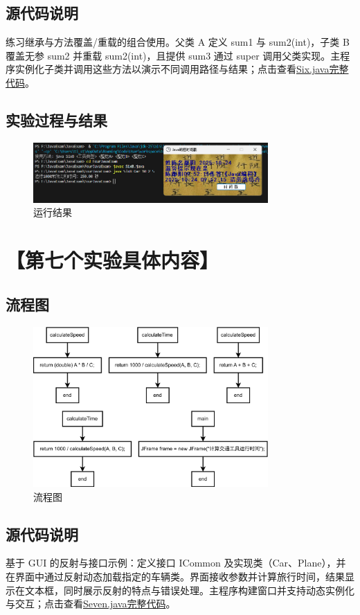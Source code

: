 \documentclass[12pt,a4paper]{article}
\begin{document}
\subsection*{源代码说明}
练习继承与方法覆盖/重载的组合使用。父类 A 定义 sum1 与 sum2(int)，子类 B 覆盖无参 sum2 并重载 sum2(int)，且提供 sum3 通过 super 调用父类实现。主程序实例化子类并调用这些方法以演示不同调用路径与结果；点击查看\hyperref[sec:six]{Six.java完整代码}。

\subsection*{实验过程与结果}

\begin{figure}[H]
\centering
\includegraphics[width=0.8\textwidth]{sixb.png}
\caption{运行结果}
\end{figure}

\section*{【第七个实验具体内容】}
\subsection*{流程图}

\begin{figure}[H]
\centering
\includegraphics[width=0.8\textwidth]{sevenb1.png}
\caption{流程图}
\end{figure}

\subsection*{源代码说明}
基于 GUI 的反射与接口示例：定义接口 ICommon 及实现类（Car、Plane），并在界面中通过反射动态加载指定的车辆类。界面接收参数并计算旅行时间，结果显示在文本框，同时展示反射的特点与错误处理。主程序构建窗口并支持动态实例化与交互；点击查看\hyperref[sec:seven]{Seven.java完整代码}。
\end{document}
